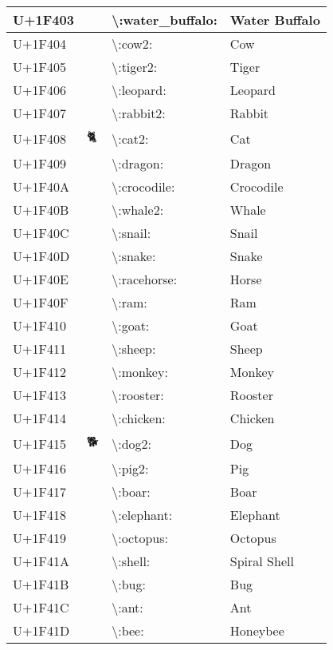 \begin{table}[h]
\begin{tabulary}{\linewidth}{|L|L|L|L|}
\hline
U+1F403 & 🐃 & {\textbackslash}:water\_buffalo: & Water Buffalo \\
\hline
U+1F404 & 🐄 & {\textbackslash}:cow2: & Cow \\
\hline
U+1F405 & 🐅 & {\textbackslash}:tiger2: & Tiger \\
\hline
U+1F406 & 🐆 & {\textbackslash}:leopard: & Leopard \\
\hline
U+1F407 & 🐇 & {\textbackslash}:rabbit2: & Rabbit \\
\hline
U+1F408 & 🐈 & {\textbackslash}:cat2: & Cat \\
\hline
U+1F409 & 🐉 & {\textbackslash}:dragon: & Dragon \\
\hline
U+1F40A & 🐊 & {\textbackslash}:crocodile: & Crocodile \\
\hline
U+1F40B & 🐋 & {\textbackslash}:whale2: & Whale \\
\hline
U+1F40C & 🐌 & {\textbackslash}:snail: & Snail \\
\hline
U+1F40D & 🐍 & {\textbackslash}:snake: & Snake \\
\hline
U+1F40E & 🐎 & {\textbackslash}:racehorse: & Horse \\
\hline
U+1F40F & 🐏 & {\textbackslash}:ram: & Ram \\
\hline
U+1F410 & 🐐 & {\textbackslash}:goat: & Goat \\
\hline
U+1F411 & 🐑 & {\textbackslash}:sheep: & Sheep \\
\hline
U+1F412 & 🐒 & {\textbackslash}:monkey: & Monkey \\
\hline
U+1F413 & 🐓 & {\textbackslash}:rooster: & Rooster \\
\hline
U+1F414 & 🐔 & {\textbackslash}:chicken: & Chicken \\
\hline
U+1F415 & 🐕 & {\textbackslash}:dog2: & Dog \\
\hline
U+1F416 & 🐖 & {\textbackslash}:pig2: & Pig \\
\hline
U+1F417 & 🐗 & {\textbackslash}:boar: & Boar \\
\hline
U+1F418 & 🐘 & {\textbackslash}:elephant: & Elephant \\
\hline
U+1F419 & 🐙 & {\textbackslash}:octopus: & Octopus \\
\hline
U+1F41A & 🐚 & {\textbackslash}:shell: & Spiral Shell \\
\hline
U+1F41B & 🐛 & {\textbackslash}:bug: & Bug \\
\hline
U+1F41C & 🐜 & {\textbackslash}:ant: & Ant \\
\hline
U+1F41D & 🐝 & {\textbackslash}:bee: & Honeybee \\

\end{tabulary}
\end{table}
